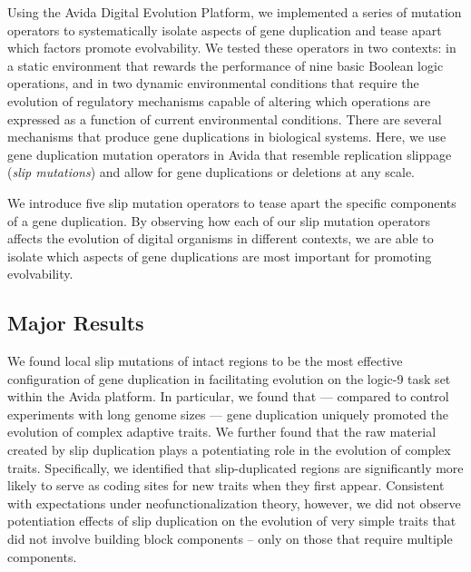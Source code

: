 Using the Avida Digital Evolution Platform, we implemented a series of mutation operators to systematically isolate aspects of gene duplication and tease apart which factors promote evolvability. We tested these operators in two %
contexts: in a static environment that rewards the performance of nine basic Boolean logic operations, and in two dynamic environmental conditions that require the evolution of regulatory mechanisms capable of altering which operations are expressed as a function of current environmental conditions. %
There are several mechanisms that produce gene duplications in biological systems. Here, we use gene duplication mutation operators in Avida that resemble replication slippage \citep{bzymek_instability_2001} (\textit{slip mutations}) and allow for gene duplications or deletions at any scale.

We introduce five slip mutation operators to tease apart the specific components of a gene duplication.
By observing how each of our slip mutation operators affects the evolution of digital organisms in different contexts, we are able to isolate which aspects of gene duplications are most important for promoting evolvability.

\subsection{Major Results}

We found local slip mutations of intact regions to be the most effective configuration of gene duplication in facilitating evolution on the logic-9 task set within the Avida platform.
In particular, we found that --- compared to control experiments with long genome sizes --- gene duplication uniquely promoted the evolution of complex adaptive traits.
We further found that the raw material created by slip duplication plays a potentiating role in the evolution of complex traits.
Specifically, we identified that slip-duplicated regions are significantly more likely to serve as coding sites for new traits when they first appear.
Consistent with expectations under neofunctionalization theory, however, we did not observe potentiation effects of slip duplication on the evolution of very simple traits that did not involve building block components -- only on those that require multiple components.

